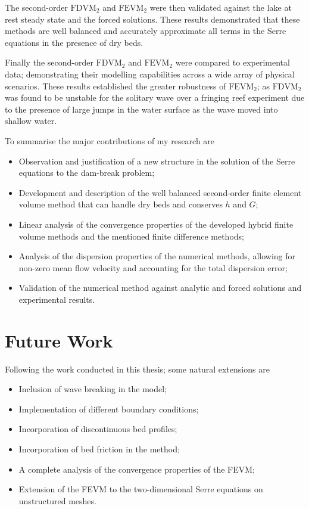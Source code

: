 The second-order $\text{FDVM}_2$ and $\text{FEVM}_2$ were then validated against the lake at rest steady state and the forced solutions. These results demonstrated that these methods are well balanced and accurately approximate all terms in the Serre equations in the presence of dry beds. 

Finally the second-order $\text{FDVM}_2$ and $\text{FEVM}_2$ were compared to experimental data; demonstrating their modelling capabilities across a wide array of physical scenarios. These results established the greater robustness of $\text{FEVM}_2$; as $\text{FDVM}_2$ was found to be unstable for the solitary wave over a fringing reef experiment due to the presence of large jumps in the water surface as the wave moved into shallow water. 

To summarise the major contributions of my research are
\begin{itemize}
	\item Observation and justification of a new structure in the solution of the Serre equations to the dam-break problem;
	\item Development and description of the well balanced second-order finite element volume method that can handle dry beds and conserves $h$ and $G$;
	\item Linear analysis of the convergence properties of the developed hybrid finite volume methods and the mentioned finite difference methods;
	\item Analysis of the dispersion properties of the numerical methods, allowing for non-zero mean flow velocity and accounting for the total dispersion error;
	\item Validation of the numerical method against analytic and forced solutions and experimental results. 
\end{itemize}

\section{Future Work}
Following the work conducted in this thesis; some natural extensions are
\begin{itemize}
	\item Inclusion of wave breaking in the model; 
	\item Implementation of different boundary conditions;
	\item Incorporation of discontinuous bed profiles;
	\item Incorporation of bed friction in the method;
	\item A complete analysis of the convergence properties of the FEVM;
	\item Extension of the FEVM to the two-dimensional Serre equations on unstructured meshes.
\end{itemize}




